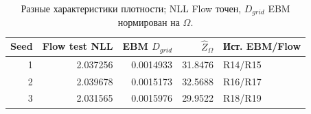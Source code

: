 \begin{table}[H]\centering\small
\setlength{\tabcolsep}{4pt}
\caption{Разные характеристики плотности; NLL Flow точен, $D_{grid}$ EBM нормирован на $\Omega$.}\label{tab:density}
\begin{tabular}{rrrrl}
\toprule
Seed & Flow test NLL & EBM $D_{grid}$ & $\hat Z_\Omega$ & Ист. EBM/Flow \\
\midrule
1 & 2.037256 & 0.0014933 & 31.8476 & R14/R15 \\
2 & 2.039678 & 0.0015173 & 32.5688 & R16/R17 \\
3 & 2.031565 & 0.0015976 & 29.9522 & R18/R19 \\
\bottomrule
\end{tabular}
\end{table}
